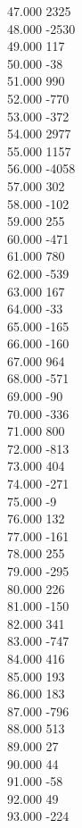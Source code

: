 { 47.000	2325 \\
 48.000	-2530 \\
 49.000	117 \\
 50.000	-38 \\
 51.000	990 \\
 52.000	-770 \\
 53.000	-372 \\
 54.000	2977 \\
 55.000	1157 \\
 56.000	-4058 \\
 57.000	302 \\
 58.000	-102 \\
 59.000	255 \\
 60.000	-471 \\
 61.000	780 \\
 62.000	-539 \\
 63.000	167 \\
 64.000	-33 \\
 65.000	-165 \\
 66.000	-160 \\
 67.000	964 \\
 68.000	-571 \\
 69.000	-90 \\
 70.000	-336 \\
 71.000	800 \\
 72.000	-813 \\
 73.000	404 \\
 74.000	-271 \\
 75.000	-9 \\
 76.000	132 \\
 77.000	-161 \\
 78.000	255 \\
 79.000	-295 \\
 80.000	226 \\
 81.000	-150 \\
 82.000	341 \\
 83.000	-747 \\
 84.000	416 \\
 85.000	193 \\
 86.000	183 \\
 87.000	-796 \\
 88.000	513 \\
 89.000	27 \\
 90.000	44 \\
 91.000	-58 \\
 92.000	49 \\
 93.000	-224 \\
}
